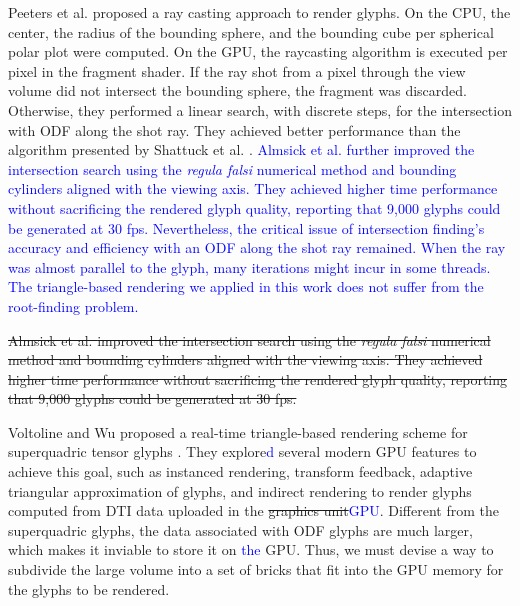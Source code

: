 \documentclass[twoside,twocolumn,10pt]{article}
\begin{document}
Peeters et al. \cite{peeters2009} proposed a ray casting approach to render glyphs. On the CPU, the center, the radius of the bounding sphere, and the bounding cube per spherical polar plot were computed. On the GPU, the raycasting algorithm is executed per pixel in the fragment shader. If the ray shot from a pixel through the view volume did not intersect the bounding sphere, the fragment was discarded. Otherwise, they performed a linear search, with discrete steps, for the intersection with ODF along the shot ray. They achieved better performance than the algorithm presented by Shattuck et al. \cite{shattuck2008}. \textcolor{blue}{Almsick et al. \cite{almsick2011} further improved the intersection search using the \textit{regula falsi} numerical method and bounding cylinders aligned with the viewing axis. They achieved higher time performance without sacrificing the rendered glyph quality, reporting that 9,000 glyphs could be generated at 30 fps. Nevertheless, the critical issue of intersection finding's accuracy and efficiency with an ODF along the shot ray remained. When the ray was almost parallel to the glyph, many iterations might incur in some threads. The triangle-based rendering we applied in this work does not suffer from the root-finding problem.} 

\sout{Almsick et al. \cite{almsick2011} improved the intersection search using the \textit{regula falsi} numerical method and bounding cylinders aligned with the viewing axis. They achieved higher time performance without sacrificing the rendered glyph quality, reporting that 9,000 glyphs could be generated at 30 fps.}



\label{ssec:superquadric_rendering}

Voltoline and Wu \cite{voltoline2021} proposed a real-time triangle-based rendering scheme for superquadric tensor glyphs \cite{Kindlmann2004}. They explore\textcolor{blue}{d} several modern GPU features to achieve this goal, such as instanced rendering, transform feedback, adaptive triangular approximation of glyphs, and indirect rendering to render glyphs computed from DTI data uploaded in the \sout{graphics unit}\textcolor{blue}{GPU}. Different from the superquadric glyphs, the data associated with ODF glyphs are much larger, which makes it inviable to store it on \textcolor{blue}{the} GPU. Thus, we must \todo{\textcolor{green}{What is the bricks division?}} devise a way to subdivide the large volume into a set of bricks that fit into the GPU memory for the glyphs to be rendered.
\end{document}
